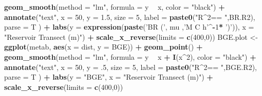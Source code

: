 \documentclass[]{article}
\newenvironment{Shaded}{\begin{snugshade}}{\end{snugshade}}
\newcommand{\KeywordTok}[1]{\textcolor[rgb]{0.13,0.29,0.53}{\textbf{#1}}}
\newcommand{\DataTypeTok}[1]{\textcolor[rgb]{0.13,0.29,0.53}{#1}}
\newcommand{\DecValTok}[1]{\textcolor[rgb]{0.00,0.00,0.81}{#1}}
\newcommand{\FloatTok}[1]{\textcolor[rgb]{0.00,0.00,0.81}{#1}}
\newcommand{\StringTok}[1]{\textcolor[rgb]{0.31,0.60,0.02}{#1}}
\newcommand{\OperatorTok}[1]{\textcolor[rgb]{0.81,0.36,0.00}{\textbf{#1}}}
\newcommand{\NormalTok}[1]{#1}
\begin{document}
\begin{Shaded}
\begin{Highlighting}[]
\StringTok{  }\KeywordTok{geom_smooth}\NormalTok{(}\DataTypeTok{method =} \StringTok{"lm"}\NormalTok{, }\DataTypeTok{formula =}\NormalTok{ y }\OperatorTok{~}\StringTok{ }\NormalTok{x, }\DataTypeTok{color =} \StringTok{"black"}\NormalTok{) }\OperatorTok{+}\StringTok{ }
\StringTok{  }\KeywordTok{annotate}\NormalTok{(}\StringTok{"text"}\NormalTok{, }\DataTypeTok{x =} \DecValTok{50}\NormalTok{, }\DataTypeTok{y =} \FloatTok{1.5}\NormalTok{, }\DataTypeTok{size =} \DecValTok{5}\NormalTok{, }
           \DataTypeTok{label =} \KeywordTok{paste0}\NormalTok{(}\StringTok{"R^2== "}\NormalTok{,BR.R2), }\DataTypeTok{parse =}\NormalTok{ T ) }\OperatorTok{+}
\StringTok{  }\KeywordTok{labs}\NormalTok{(}\DataTypeTok{y =} \KeywordTok{expression}\NormalTok{(}\KeywordTok{paste}\NormalTok{(}\StringTok{'BR ('}\NormalTok{, mu ,}\StringTok{'M C h'}\OperatorTok{^-}\DecValTok{1}\OperatorTok{*}\StringTok{ ')'}\NormalTok{)), }
       \DataTypeTok{x =} \StringTok{"Reservoir Transect (m)"}\NormalTok{) }\OperatorTok{+}
\StringTok{  }\KeywordTok{scale_x_reverse}\NormalTok{(}\DataTypeTok{limits =} \KeywordTok{c}\NormalTok{(}\DecValTok{400}\NormalTok{,}\DecValTok{0}\NormalTok{))}
\NormalTok{BGE.plot <-}\StringTok{ }\KeywordTok{ggplot}\NormalTok{(metab, }\KeywordTok{aes}\NormalTok{(}\DataTypeTok{x =}\NormalTok{ dist, }\DataTypeTok{y =}\NormalTok{ BGE)) }\OperatorTok{+}\StringTok{ }
\StringTok{  }\KeywordTok{geom_point}\NormalTok{() }\OperatorTok{+}\StringTok{ }
\StringTok{  }\KeywordTok{geom_smooth}\NormalTok{(}\DataTypeTok{method =} \StringTok{"lm"}\NormalTok{, }\DataTypeTok{formula =}\NormalTok{ y }\OperatorTok{~}\StringTok{ }\NormalTok{x }\OperatorTok{+}\StringTok{ }\KeywordTok{I}\NormalTok{(x}\OperatorTok{^}\DecValTok{2}\NormalTok{), }\DataTypeTok{color =} \StringTok{"black"}\NormalTok{) }\OperatorTok{+}
\StringTok{  }\KeywordTok{annotate}\NormalTok{(}\StringTok{"text"}\NormalTok{, }\DataTypeTok{x =} \DecValTok{50}\NormalTok{, }\DataTypeTok{y =}\NormalTok{ .}\DecValTok{5}\NormalTok{, }\DataTypeTok{size =} \DecValTok{5}\NormalTok{, }
           \DataTypeTok{label =} \KeywordTok{paste0}\NormalTok{(}\StringTok{"R^2== "}\NormalTok{,BGE.R2), }\DataTypeTok{parse =}\NormalTok{ T ) }\OperatorTok{+}
\StringTok{  }\KeywordTok{labs}\NormalTok{(}\DataTypeTok{y =} \StringTok{"BGE"}\NormalTok{, }
       \DataTypeTok{x =} \StringTok{"Reservoir Transect (m)"}\NormalTok{) }\OperatorTok{+}
\StringTok{  }\KeywordTok{scale_x_reverse}\NormalTok{(}\DataTypeTok{limits =} \KeywordTok{c}\NormalTok{(}\DecValTok{400}\NormalTok{,}\DecValTok{0}\NormalTok{))}
\end{Highlighting}
\end{Shaded}
\end{document}
